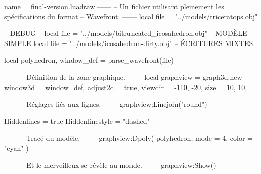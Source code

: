 \documentclass{standalone}
\begin{document}
\begin{luadraw}{name = final-version.luadraw}
------
-- Un fichier utilisant pleinement les spécifications du format
-- Wavefront.
------
local file = "../models/triceratops.obj"

-- DEBUG
-- local file = "../models/bitruncated_icosahedron.obj" -- MODÈLE SIMPLE
local file = "../models/icosahedron-dirty.obj" -- ÉCRITURES MIXTES

local polyhedron, window_def = parse_wavefront(file)

------
-- Définition de la zone graphique.
------
local graphview = graph3d:new{
  window3d = window_def,
  adjust2d = true,
  viewdir  = {-110, -20},
  size     = {10, 10},
}

------
-- Réglages liés aux lignes.
------
graphview:Linejoin("round")

Hiddenlines = true
Hiddenlinestyle = "dashed"

------
-- Tracé du modèle.
------
graphview:Dpoly(
  polyhedron,
  {
    mode  = 4,
    color = "cyan"
  })

------
-- Et le merveilleux se révèle au monde.
------
graphview:Show()
\end{luadraw}
\end{document}
